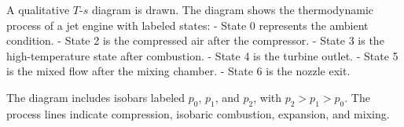 A qualitative \( T \)-\( s \) diagram is drawn. The diagram shows the thermodynamic process of a jet engine with labeled states:  
- State 0 represents the ambient condition.  
- State 2 is the compressed air after the compressor.  
- State 3 is the high-temperature state after combustion.  
- State 4 is the turbine outlet.  
- State 5 is the mixed flow after the mixing chamber.  
- State 6 is the nozzle exit.  

The diagram includes isobars labeled \( p_0 \), \( p_1 \), and \( p_2 \), with \( p_2 > p_1 > p_0 \). The process lines indicate compression, isobaric combustion, expansion, and mixing.